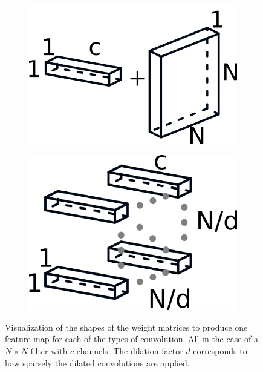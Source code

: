 \documentclass{kththesis}
\begin{document}
\begin{figure}[h]
      \begin{subfigure}[b]{0.45\textwidth}
        \includegraphics[width=\textwidth]{separable}
    \end{subfigure}
    \qquad %
    \begin{subfigure}[b]{0.4\textwidth}
        \includegraphics[width=\textwidth]{dilated}
      \end{subfigure}
      \caption{Visualization of the shapes of the weight matrices to produce one
        feature map for each of the types of convolution. All in the case of a \(N \times N\) filter
        with \(c\) channels. The dilation factor \(d\) corresponds to how
        sparsely the dilated convolutions are applied.}\label{fig:Convs}
\end{figure}
\end{document}
